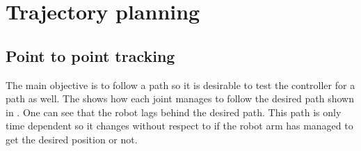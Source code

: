 \section{Trajectory planning}
\subsection{Point to point tracking}
The main objective is to follow a path so it is desirable to test the controller for a path as well. The  shows how each joint manages to follow the desired path shown in . One can see that the robot lags behind the desired path. This path is only time dependent so it changes without respect to if the robot arm has managed to get the desired position or not.\\\\
\def\picsSiz{1.08}
